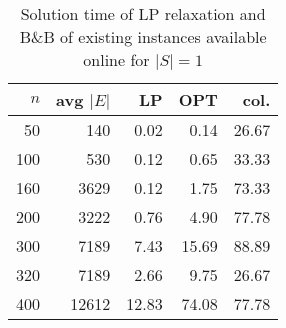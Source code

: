 \begin{table}[]
	\centering
\begin{tabular}{rrrrr}
$n$ & avg $|E|$ & LP  & OPT &  col. \\
\hline
  50 & 140  & 0.02&0.14 & 26.67\\
 100 & 530  & 0.12&0.65 & 33.33\\
 160 &3629  & 0.12&1.75 & 73.33\\
 200 &3222  & 0.76&4.90 & 77.78\\
 300 &7189  & 7.43&15.69& 88.89\\
 320 &7189  & 2.66& 9.75& 26.67\\
 400 &12612 &12.83&74.08& 77.78
\end{tabular}
\caption{Solution time of LP relaxation and B\&B of existing instances available online for $|S|=1$}
\label{tab:soltime-exist}
\end{table}

